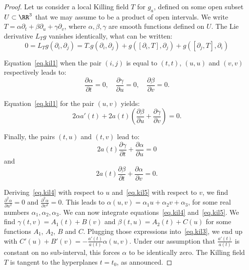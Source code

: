 \begin{proof}
Let us consider a local Killing field $T$ for $g_a$, defined on some open subset $U \subset \RR^3$ that we may assume to be a product of open intervals. We write $T=\alpha \partial_t + \beta \partial_u + \gamma \partial_v$, where $\alpha, \beta, \gamma$ are smooth functions defined on $U$. The Lie derivative $L_Tg$ vanishes identically, what can be written:
\begin{equation}\label{eq.kil1}
0=L_Tg(\partial_i,\partial_j)=T.g(\partial_i,\partial_j)+g([\partial_i,T],\partial_j)+ g([\partial_j,T],\partial_i)
\end{equation}

Equation~\eqref{eq.kil1} when the pair $(i,j)$ is equal to $(t,t)$, $(u,u)$ and $(v,v)$ respectively leads to:
\begin{equation}\label{eq.kil2}
\frac{\partial \alpha}{\partial t}=0, \quad \frac{\partial \gamma}{\partial u}=0, \quad \frac{\partial \beta}{\partial v}=0.
\end{equation}

Equation~\eqref{eq.kil1} for the pair $(u,v)$ yields:
\begin{equation}\label{eq.kil3}
2 \alpha a'(t)+2 a(t)\left(\frac{\partial \beta}{\partial u}+ \frac{\partial \gamma}{\partial v}\right)=0.
\end{equation}

Finally, the pairs $(t,u)$ and $(t,v)$ lead to:
\begin{equation}\label{eq.kil4}
2 a(t) \frac{\partial \gamma}{\partial t}+ \frac{\partial \alpha}{\partial u}=0
\end{equation}
and
\begin{equation}\label{eq.kil5}
2 a(t) \frac{\partial \beta}{\partial t}+ \frac{\partial \alpha}{\partial v}=0.
\end{equation}

Deriving~\eqref{eq.kil4} with respect to $u$ and~\eqref{eq.kil5} with respect to $v$, we find $\frac{\partial^2 \alpha}{\partial u^2}=0$ and $\frac{\partial^2 \alpha}{\partial v^2}=0$. This leads to $\alpha(u,v)=\alpha_1 u + \alpha_2 v+ \alpha_3$, for some real numbers $\alpha_1, \alpha_2, \alpha_3$. We can now integrate equations~\eqref{eq.kil4} and~\eqref{eq.kil5}. We find $\gamma(t,v)=A_1(t)+B(v)$ and $\beta(t,u)=A_2(t)+C(u)$ for some functions $A_1$, $A_2$, $B$ and $C$. Plugging those expressions into~\eqref{eq.kil3}, we end up with $C'(u)+B'(v)=-\frac{a'(t)}{a(t)}\alpha(u,v)$. Under our assumption that $\frac{a'(t)}{a(t)}$ is constant on no sub-interval, this forces $\alpha$ to be identically zero. The Killing field $T$ is tangent to the hyperplanes $t=t_0$, as announced.


\end{proof}
